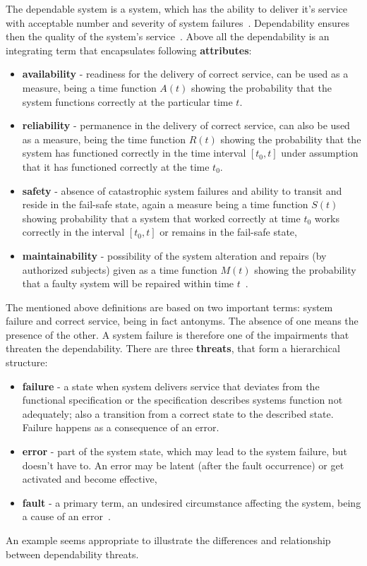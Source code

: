 The dependable system is a system, which has the ability to deliver it's service with acceptable number and severity of system failures~\cite{art:Avizienis}. Dependability ensures then the quality of the system's service~\cite{art:Laprie}. Above all the dependability is an integrating term that encapsulates following \textbf{attributes}:
\begin{itemize}
\item \textbf{availability} - readiness for the delivery of correct service, can be used as a  measure, being a time function $A(t)$ showing the probability that the system functions correctly at the particular time $t$. 
\item \textbf{reliability} - permanence in the delivery of correct service, can also be used as a measure, being the time function $R(t)$ showing the probability that the system has functioned correctly in the time interval $[t_0,t]$ under assumption that it has functioned correctly at the time $t_0$.
\item \textbf{safety} - absence of catastrophic system failures and ability to transit and reside in the fail-safe state, again a measure being a time function $S(t)$ showing probability that a system that worked correctly at time $t_0$ works correctly in the interval $[t_0,t]$ or remains in the fail-safe state,
\item \textbf{maintainability} - possibility of the system alteration and repairs (by authorized subjects) given as a time function $M(t)$ showing the probability that a faulty system will be repaired within time $t$~\cite{art:Laprie, art:Avizienis, art:Avizienis2}.
\end{itemize}
The mentioned above definitions are based on two important terms: system failure and correct service, being in fact antonyms. The absence of one means the presence of the other. A system failure is therefore one of the impairments that threaten the dependability. There are three \textbf{threats}, that form a hierarchical structure:
\begin{itemize}
    \item \textbf{failure} - a state when system delivers service that deviates from the functional specification or the specification describes systems function not adequately; also a transition from a correct state to the described state. Failure happens as a consequence of an error.
    \item \textbf{error} - part of the system state, which may lead to the system failure, but doesn't have to. An error may be latent (after the fault occurrence) or get activated and become effective,
    \item \textbf{fault} - a primary term, an undesired circumstance affecting the system, being a cause of an error~\cite{art:Avizienis, art:Avizienis2}. 
\end{itemize}
An example seems appropriate to illustrate the differences and relationship between dependability threats. 

